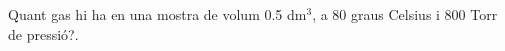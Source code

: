 \begin{exr}{}
Quant gas hi ha en una mostra de volum 0.5 dm$^3$, a 80 graus Celsius i 800 Torr de pressió?.
\end{exr}
